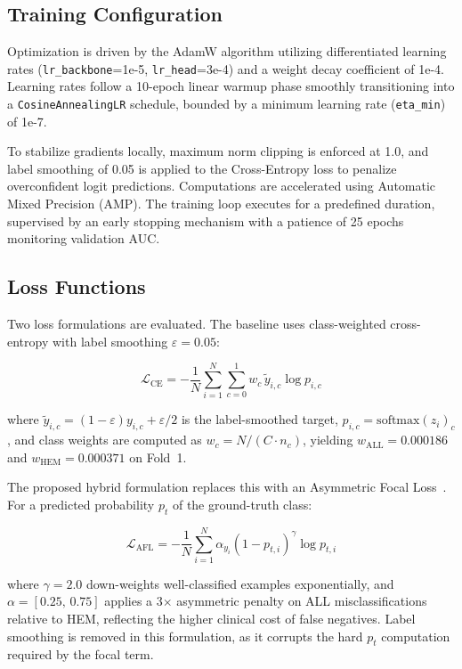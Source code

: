 \documentclass[journal]{IEEEtran}
\begin{document}
    \subsection{Training Configuration}
    Optimization is driven by the AdamW algorithm utilizing differentiated learning rates (\texttt{lr\_backbone}=1e-5, \texttt{lr\_head}=3e-4) and a weight decay coefficient of 1e-4. Learning rates follow a 10-epoch linear warmup phase smoothly transitioning into a \texttt{CosineAnnealingLR} schedule, bounded by a minimum learning rate (\texttt{eta\_min}) of 1e-7. 

    To stabilize gradients locally, maximum norm clipping is enforced at 1.0, and label smoothing of 0.05 is applied to the Cross-Entropy loss to penalize overconfident logit predictions. Computations are accelerated using Automatic Mixed Precision (AMP). The training loop executes for a predefined duration, supervised by an early stopping mechanism with a patience of 25 epochs monitoring validation AUC.

    \subsection{Loss Functions}

    Two loss formulations are evaluated. The baseline uses class-weighted
    cross-entropy with label smoothing $\varepsilon=0.05$:

    \begin{equation}
    \mathcal{L}_{\text{CE}} = -\frac{1}{N}\sum_{i=1}^{N}\sum_{c=0}^{1}
    w_c \, \tilde{y}_{i,c} \log p_{i,c}
    \label{eq:ce}
    \end{equation}

    where $\tilde{y}_{i,c} = (1-\varepsilon)y_{i,c} + \varepsilon/2$
    is the label-smoothed target, $p_{i,c} = \text{softmax}(z_i)_c$,
    and class weights are computed as $w_c = N/(C \cdot n_c)$,
    yielding $w_{\text{ALL}}=0.000186$ and $w_{\text{HEM}}=0.000371$
    on Fold~1.

    The proposed hybrid formulation replaces this with an Asymmetric
    Focal Loss~\cite{b_focal}. For a predicted probability
    $p_t$ of the ground-truth class:

    \begin{equation}
    \mathcal{L}_{\text{AFL}} = -\frac{1}{N}\sum_{i=1}^{N}
    \alpha_{y_i}(1 - p_{t,i})^{\gamma} \log p_{t,i}
    \label{eq:afl}
    \end{equation}

    where $\gamma=2.0$ down-weights well-classified examples
    exponentially, and $\alpha=[0.25,\, 0.75]$ applies a 3$\times$
    asymmetric penalty on ALL misclassifications relative to HEM,
    reflecting the higher clinical cost of false negatives.
    Label smoothing is removed in this formulation, as it corrupts
    the hard $p_t$ computation required by the focal term.
\end{document}
